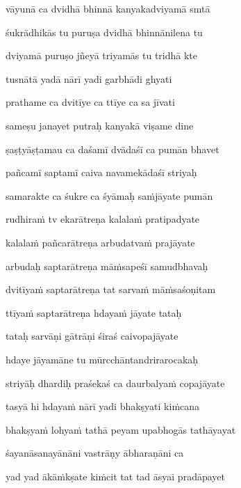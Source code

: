 vāyunā ca dvidhā bhinnā kanyakadviyamā smtā \veg\dontdisplaylinenum

śukrādhikās tu puruṣa dvidhā bhinnānilena tu\thinspace{\dandab} \dontdisplaylinenum

dviyamā puruṣo jñeyā triyamās tu tridhā kte \veg\dontdisplaylinenum

tusnātā yadā nārī yadi garbhādi ghyati\thinspace{\dandab} \dontdisplaylinenum

prathame ca dvitīye ca ttīye ca sa jīvati \veg\dontdisplaylinenum

sameṣu janayet putraḥ kanyakā viṣame dine\thinspace{\dandab} \dontdisplaylinenum

ṣaṣṭyāṣṭamau ca daśamī dvādaśī ca pumān bhavet \veg\dontdisplaylinenum

pañcamī saptamī caiva navamekādaśī striyaḥ\thinspace{\dandab} \dontdisplaylinenum

samarakte ca śukre ca śyāmaḥ saṁjāyate pumān \veg\dontdisplaylinenum

rudhiraṁ tv ekarātreṇa kalalaṁ pratipadyate\thinspace{\dandab} \dontdisplaylinenum

kalalaṁ pañcarātreṇa arbudatvaṁ prajāyate \veg\dontdisplaylinenum

arbudaḥ saptarātreṇa māṁsapeśī samudbhavaḥ\thinspace{\dandab} \dontdisplaylinenum

dvitīyaṁ saptarātreṇa tat sarvaṁ māṁsaśoṇitam \veg\dontdisplaylinenum

ttīyaṁ saptarātreṇa hdayaṁ jāyate tataḥ\thinspace{\dandab} \dontdisplaylinenum

tataḥ sarvāṇi gātrāṇi śiraś caivopajāyate \veg\dontdisplaylinenum

hdaye jāyamāne tu mūrcchāntandrirarocakaḥ\thinspace{\dandab} \dontdisplaylinenum

striyāḥ dhardiḥ praśekaś ca daurbalyaṁ copajāyate \veg\dontdisplaylinenum

tasyā hi hdayaṁ nārī yadi bhakṣyati kiṁcana\thinspace{\dandab} \dontdisplaylinenum

bhakṣyaṁ lohyaṁ tathā peyam upabhogās tathāyayat \veg\dontdisplaylinenum

śayanāsanayānāni vastrāṇy ābharaṇāni ca\thinspace{\dandab} \dontdisplaylinenum

yad yad ākāṁkṣate kiṁcit tat tad āsyai pradāpayet \veg\dontdisplaylinenum

